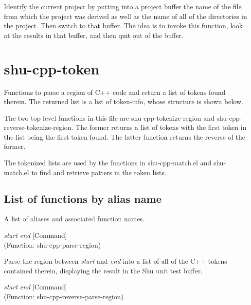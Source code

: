 \begin{doc-string}
Identify the current project by putting into a project buffer the name of the file
from which the project was derived as well as the name of all of the directories in the
project.  Then switch to that buffer.  The idea is to invoke this function, look at the
results in that buffer, and then quit out of the buffer.
\end{doc-string}

\eject
\section{shu-cpp-token}


Functions to parse a region of C++ code and return a list of tokens
found therein.  The returned list is a list of token-info, whose structure
is shown below.

The two top level functions in this file are shu-cpp-tokenize-region and
shu-cpp-reverse-tokenize-region.  The former returns a list of tokens with the
first token in the list being the first token found.  The latter function
returns the reverse of the former.

The tokenized lists are used by the functions in shu-cpp-match.el and
shu-match.el to find and retrieve patters in the token lists.


\subsection{List of functions by alias name}

A list of aliases and associated function names.



\vspace{1em}
\noindent
{}
\usebox{\funcname}\emph{start} \emph{end}
 \hfill [Command]\\%
 (Function: shu-cpp-parse-region)

\begin{doc-string}
Parse the region between \emph{start} and \emph{end} into a list of all of the C++ tokens
contained therein, displaying the result in the Shu unit test buffer.
\end{doc-string}

\vspace{1em}
\noindent
{}
\usebox{\funcname}\emph{start} \emph{end}
 \hfill [Command]\\%
 (Function: shu-cpp-reverse-parse-region)

